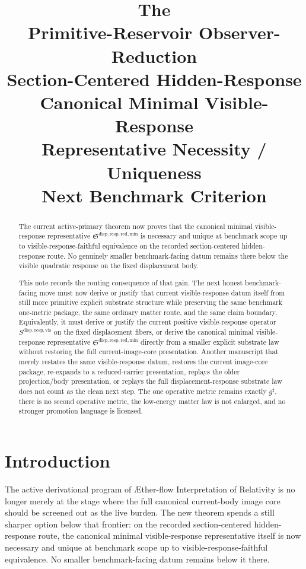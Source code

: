 \documentclass[11pt]{article}
\title{\textbf{The \TheoryName{}}\\[0.4em]
\large Primitive-Reservoir Observer-Reduction\\
\large Section-Centered Hidden-Response\\
\large Canonical Minimal Visible-Response\\
\large Representative Necessity / Uniqueness\\
\large Next Benchmark Criterion}
\author{}
\date{}
\newcommand{\Aflow}{\AE{}ther-flow}
\newcommand{\TheoryName}{\Aflow{} Interpretation of Relativity}
\newcommand{\CompletedMetric}{g^{\sharp}}
\newcommand{\VisibleResponseOperator}{S^{\mathrm{disp,resp,vis}}}
\newcommand{\MinimalReducedStructure}{\mathfrak S^{\mathrm{disp,resp,red,min}}}
\begin{document}
\maketitle

\begin{abstract}
The current active-primary theorem now proves that the canonical minimal visible-response representative \(\MinimalReducedStructure\) is necessary and unique at benchmark scope up to visible-response-faithful equivalence on the recorded section-centered hidden-response route. No genuinely smaller benchmark-facing datum remains there below the visible quadratic response on the fixed displacement body.

This note records the routing consequence of that gain. The next honest benchmark-facing move must now derive or justify that current visible-response datum itself from still more primitive explicit substrate structure while preserving the same benchmark one-metric package, the same ordinary matter route, and the same claim boundary. Equivalently, it must derive or justify the current positive visible-response operator \(\VisibleResponseOperator\) on the fixed displacement fibers, or derive the canonical minimal visible-response representative \(\MinimalReducedStructure\) directly from a smaller explicit substrate law without restoring the full current-image-core presentation. Another manuscript that merely restates the same visible-response datum, restores the current image-core package, re-expands to a reduced-carrier presentation, replays the older projection/body presentation, or replays the full displacement-response substrate law does not count as the clean next step. The one operative metric remains exactly \(\CompletedMetric\), there is no second operative metric, the low-energy matter law is not enlarged, and no stronger promotion language is licensed.
\end{abstract}

\section{Introduction}

The active derivational program of \TheoryName{} is no longer merely at the stage where the full canonical current-body image core should be screened out as the live burden. The new theorem spends a still sharper option below that frontier: on the recorded section-centered hidden-response route, the canonical minimal visible-response representative itself is now necessary and unique at benchmark scope up to visible-response-faithful equivalence. No smaller benchmark-facing datum remains below it there.
\end{document}
